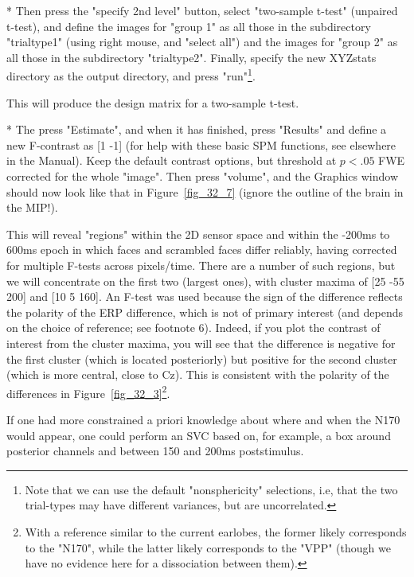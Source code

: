 * Then press the "specify 2nd level" button,  select "two-sample t-test" (unpaired t-test), and define the images for "group 1" as all those in the subdirectory "trialtype1" (using right mouse, and "select all") and the images for "group 2" as all those in the subdirectory "trialtype2". Finally, specify the new XYZstats directory as the output directory, and press "run"\footnote{Note that we can use the default "nonsphericity" selections, i.e, that the two trial-types may have different variances, but are uncorrelated.}.



This will produce the design matrix for a two-sample t-test.

* The press "Estimate", and when it has finished, press "Results" and define a new F-contrast as [1 -1] (for help with these basic SPM functions, see elsewhere in the Manual). Keep the default contrast options, but threshold at $p<.05$ FWE corrected for the whole "image". Then press "volume", and the Graphics window should now look like that in Figure~\ref{fig_32_7} (ignore the outline of the brain in the MIP!).

This will reveal "regions" within the 2D sensor space and within the -200ms to 600ms epoch in which faces and scrambled faces differ reliably, having corrected for multiple F-tests across pixels/time. There are a number of such regions, but we will concentrate on the first two (largest ones), with cluster maxima of  [25 -55 200] and [10 5 160]. An F-test was used because the sign of the difference reflects the polarity of the ERP difference, which is not of primary interest (and depends on the choice of reference; see footnote 6). Indeed, if you plot the contrast of interest from the cluster maxima, you will see that the difference is negative for the first cluster (which is located posteriorly) but positive for the second cluster (which is more central, close to Cz). This is consistent with the polarity of the differences in Figure~\ref{fig_32_3}\footnote{With a reference similar to the current earlobes, the former likely corresponds to the "N170", while the latter likely corresponds to the "VPP" (though we have no evidence here for a dissociation between them).}.

If one had more constrained a priori knowledge about where and when the N170 would appear, one could perform an SVC based on, for example, a box around posterior channels and between 150 and 200ms poststimulus.

